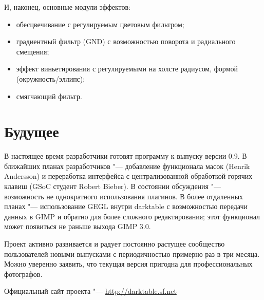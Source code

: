 \documentclass[10pt, a5paper]{article}
\begin{document}
И, наконец, основные модули эффектов:
\begin{itemize}
\item обесцвечивание с регулируемым цветовым фильтром;
\item градиентный фильтр (GND) с возможностью поворота и радиального смещения;
\item эффект виньетирования с регулируемыми на холсте радиусом, формой (окружность/эллипс);
\item смягчающий фильтр.
\end{itemize}
\section*{Будущее}
В настоящее время разработчики готовят программу к выпуску версии 0.9. В ближайших планах разработчиков "--- добавление функционала масок (Henrik Andersson) и переработка интерфейса с централизованной обработкой горячих клавиш (GSoC студент Robert Bieber). В состоянии обсуждения "--- возможность не  однократного использования плагинов. В более отдаленных планах "--- использование GEGL внутри darktable с возможностью передачи данных в GIMP и обратно для более сложного редактирования; этот функционал может появиться не раньше выхода GIMP 3.0.

Проект активно развивается и радует постоянно растущее сообщество пользователей новыми выпусками с периодичностью примерно раз в три месяца. Можно уверенно заявить, что текущая версия пригодна для профессиональных фотографов.

\begin{thebibliography}{9}
 Официальный сайт проекта "--- \url{http://darktable.sf.net}
\end{thebibliography}
\end{document}
